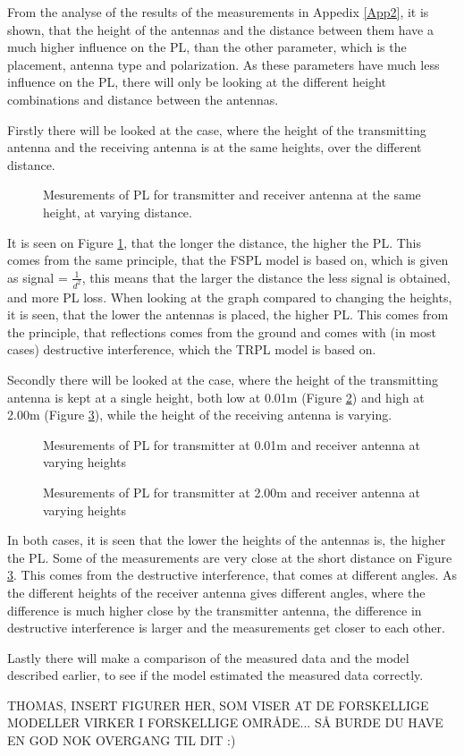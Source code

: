 From the analyse of the results of the measurements in Appedix \ref{App2}, it is shown, that the height of the antennas and the distance between them have a much higher influence on the PL, than the other parameter, which is the placement, antenna type and polarization. As these parameters have much less influence on the PL, there will only be looking at the different height combinations and distance between the antennas.

Firstly there will be looked at the case, where the height of the transmitting antenna and the receiving antenna is at the same heights, over the different distance.

\begin{figure}[!htbp]
\centering

\caption{Mesurements of PL for transmitter and receiver antenna at the same height, at varying distance.}
\label{Meas1}
\end{figure}

It is seen on Figure \ref{Meas1}, that the longer the distance, the higher the PL. This comes from the same principle, that the FSPL model is based on, which is given as signal = $\frac{1}{d^{2}}$, this means that the larger the distance the less signal is obtained, and more PL loss. When looking at the graph compared to changing the heights, it is seen, that the lower the antennas is placed, the higher PL. This comes from the principle, that reflections comes from the ground and comes with (in most cases) destructive interference, which the TRPL model is based on. 

Secondly there will be looked at the case, where the height of the transmitting antenna is kept at a single height, both low at 0.01m (Figure \ref{Meas2}) and high at 2.00m (Figure \ref{Meas3}), while the height of the receiving antenna is varying.

\begin{figure}[!htbp]
\centering

\caption{Mesurements of PL for transmitter at 0.01m and receiver antenna at varying heights}
\label{Meas2}
\end{figure}

\begin{figure}[!htbp]
\centering

\caption{Mesurements of PL for transmitter at 2.00m and receiver antenna at varying heights}
\label{Meas3}
\end{figure}

In both cases, it is seen that the lower the heights of the antennas is, the higher the PL. Some of the measurements are very close at the short distance on Figure \ref{Meas3}. This comes from the destructive interference, that comes at different angles. As the different heights of the receiver antenna gives different angles, where the difference is much higher close by the transmitter antenna, the difference in destructive interference is larger and the measurements get closer to each other.

Lastly there will make a comparison of the measured data and the model described earlier, to see if the model estimated the measured data correctly.

THOMAS, INSERT FIGURER HER, SOM VISER AT DE FORSKELLIGE MODELLER VIRKER I FORSKELLIGE OMRÅDE... SÅ BURDE DU HAVE EN GOD NOK OVERGANG TIL DIT :)